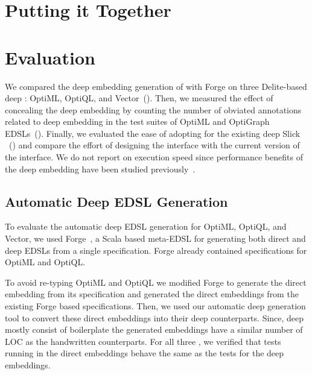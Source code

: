 \section{Putting it Together}
\label{sec:putting-it-together}





\section{Evaluation}
\label{sec:ch2-evaluation}

We compared the deep embedding generation of \yy with Forge on three Delite-based
 deep \edsls: OptiML, OptiQL, and Vector~().
Then, we measured the effect of concealing the deep embedding by counting the
number of obviated annotations related to deep embedding in the test suites of OptiML
and OptiGraph EDSLs~(). Finally, we evaluated the ease
of adopting \yy for the existing deep \edsl Slick~\cite{slick}
~() and compare the effort of designing the interface with
the current version of the interface. We do not report on execution speed since performance
benefits of the deep embedding have been studied previously~\cite{rompf_optimizing_2013,forge}.

\subsection{Automatic Deep EDSL Generation}
\label{subsec:eval-deepgen}

To evaluate the automatic deep EDSL generation for OptiML, OptiQL, and Vector,
we used Forge~\cite{forge}, a Scala based meta-EDSL for generating both direct
and deep EDSLs from a single specification. Forge already contained
specifications for OptiML and OptiQL.

To avoid re-typing OptiML and OptiQL we modified Forge to generate the direct
embedding from its specification and generated the direct embeddings
from the existing Forge based \edsl specifications. Then, we used our automatic deep
generation tool to convert these direct embeddings into their deep
counterparts. Since, deep \edsls mostly consist of boilerplate the generated
embeddings have a similar number of LOC as the handwritten counterparts. For all
three \edsls, we verified that tests running in the direct embeddings behave the
same as the tests for the deep embeddings.

